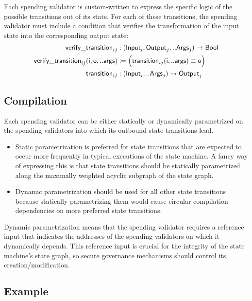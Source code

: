 \documentclass[../midgard.tex]{subfiles}
\begin{document}
Each spending validator is custom-written to express the specific logic of the possible transitions out of its state.
For each of these transitions, the spending validator must include a condition that verifies the transformation of the input state into the corresponding output state:
\begin{align*}
    \mathsf{verify\_transition}_{ij} &: (\mathsf{Input}_i, \mathsf{Output}_j, ..\mathsf{Args}_j) -> \mathsf{Bool} \\
    \mathsf{verify\_transition}_{ij}\mathsf{(i, o, ..args)} &\coloneq
        \Bigl( \mathsf{transition}_{ij}\mathsf{(i, ..args) \equiv \mathsf{o}} \Bigr) \\
    \mathsf{transition}_{ij} &: (\mathsf{Input}_i, ..\mathsf{Args}_j) -> \mathsf{Output}_j
\end{align*}

\subsection{Compilation}
\label{h:single-threaded-state-machine-compilation}

Each spending validator can be either statically or dynamically parametrized on the spending validators into which its outbound state transitions lead.

\begin{itemize}
    \item Static parametrization is preferred for state transitions that are expected to occur more frequently in typical executions of the state machine.
      A fancy way of expressing this is that state transitions should be statically parametrized along the maximally weighted acyclic subgraph of the state graph.
    \item Dynamic parametrization should be used for all other state transitions because statically parametrizing them would cause circular compilation dependencies on more preferred state transitions.
\end{itemize}

Dynamic parametrization means that the spending validator requires a reference input that indicates the addresses of the spending validators on which it dynamically depends.
This reference input is crucial for the integrity of the state machine's state graph, so secure governance mechanisms should control its creation/modification.

\subsection{Example}
\label{h:single-threaded-state-machine-example}
\end{document}
